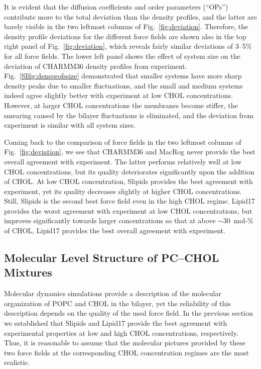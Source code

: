 \documentclass[aps,prl,superscriptaddress]{revtex4-2}
\begin{document}
It is evident that the diffusion coefficients and order parameters (``OPs'') contribute more to the total deviation than the density profiles, and the latter are barely visible in the two leftmost columns of Fig.~\ref{fig:deviation}. Therefore, the density profile deviations for the different force fields are shown also in the top right panel of Fig.~\ref{fig:deviation}, which reveals fairly similar deviations of 3--5\% for all force fields. The lower left panel shows the effect of system size on the deviation of CHARMM36 density profiles from experiment. Fig.~\ref{SIfig:densprofssize} demonstrated that smaller systems have more sharp density peaks due to smaller fluctuations, and the small and medium systems indeed agree slightly better with experiment at low CHOL concentrations. However, at larger CHOL concentrations the membranes become stiffer, the smearing caused by the bilayer fluctuations is eliminated, and the deviation from experiment is similar with all system sizes. 

Coming back to the comparison of force fields in the two leftmost columns of Fig.~\ref{fig:deviation}, we see that CHARMM36 and MacRog never provide the best overall agreement with experiment. The latter performs relatively well at low CHOL concentrations, but its quality deteriorates significantly upon the addition of CHOL. At low CHOL concentration, Slipids provides the best agreement with experiment, yet its quality decreases slightly at higher CHOL concentrations. Still, Slipids is the second best force field even in the high CHOL regime. Lipid17 provides the worst agreement with experiment at low CHOL concentrations, but improves significantly towards larger concentrations so that at above $\sim$30~mol-\% of CHOL, Lipid17 provides the best overall agreement with experiment. 

\subsection{Molecular Level Structure of PC--CHOL Mixtures}

Molecular dynamics simulations provide a description of the molecular organization of POPC and CHOL in the bilayer, yet the reliability of this description depends on the quality of the used force field. In the previous section we established that Slipids and Lipid17 provide the best agreement with experimental properties at low and high CHOL concentrations, respectively. Thus, it is reasonable to assume that the molecular pictures provided by these two force fields at the corresponding CHOL concentration regimes are the most realistic.
\end{document}
